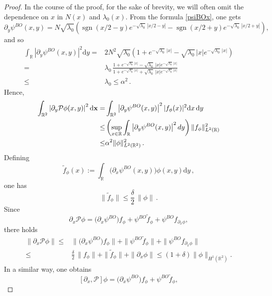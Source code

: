 \documentclass[10pt,a4paper]{amsart}
\newcommand{\NN}{N}
\newcommand{\PP}{\mathcal P}
\newcommand{\RE}{\mathbb R}
\renewcommand{\d}{\mathrm{d}}
\DeclareMathOperator{\sgn}{sgn}
\newcommand{\x}{{\bf  x}}
\begin{document}
\begin{proof}
In the course of the proof, for the sake of brevity, we will often omit the dependence on $x$ in $\NN(x)$ and $\lambda_0(x)$. From the formula \eqref{psiBOx}, one gets
\[
\partial_y \psi^{BO}(x,y) =     {\NN}\sqrt{\lambda_0 } 
\left(\sgn(x/2-y)e^{-\sqrt{\lambda_0 }\,|x/2-y|} - \sgn(x/2+y)e^{-\sqrt{\lambda_0 }\,|x/2+y|}\right) ,
\]
and so
\[\begin{aligned}
\int_\RE \left|\partial_y\psi^{BO}(x,y)\right|^2 \d y  
= & 2 \NN^2 \sqrt{\lambda_0 }\left(1+e^{-\sqrt{\lambda_0 }\,|x|} -\sqrt{\lambda_0 }\,|x| e^{-\sqrt{\lambda_0 }\,|x|} \right) \\ =&  \lambda_0 \,\frac{1+e^{-\sqrt{\lambda_0 }\,|x|} -\sqrt{\lambda_0 }\,|x| e^{-\sqrt{\lambda_0 }\,|x|} }{1+e^{-\sqrt{\lambda_0 }\,|x|} +\sqrt{\lambda_0 }\,|x| e^{-\sqrt{\lambda_0 }\,|x|} } \\
\leq &\lambda_0  \leq\alpha^2\,.
\end{aligned}\]
Hence,
\begin{align*}
\int_{\RE^2}\left|\partial_y\mathcal{P} \phi(x,y)\right|^2 \d\x  = &\int_{\RE^2} \left|\partial_y\psi^{BO}(x,y)\right|^2 |f_\phi(x)|^2 \d x\,\d y  \\
  \leq & \left(\sup_{x \in \RE} \int_\RE \left|\partial_y\psi^{BO}(x,y)
\right|^2 dy \right)\|f_{\phi}\|^2_{L^2(\RE)}\\
\leq &\alpha^{2}\| \phi \|^2_{L^2(\RE^2)}\, .
\end{align*} 
Defining
\begin{equation*}%
    \tilde f_\phi(x) :=  \int_{\RE} \big(\partial_x\psi^{BO}(x,y)\big) \phi(x,y) \d y \,,
    \end{equation*}
one has
     \[
\|  \tilde f_\phi\| \leq \frac{\delta}{2}\,\|\phi\|\,. 
    \]
    Since
    \begin{equation*}%
    \partial_x \PP\phi  = \big(\partial_x\psi^{BO}\big) f_\phi  +\psi^{BO}\tilde f_\phi +  \psi^{BO}f_{\partial_x\phi},
    \end{equation*}
    there holds 
  \[\begin{aligned}
    \|\partial_x \PP \phi\|  \leq & \|\big(\partial_x\psi^{BO}\big) f_\phi\|  +\|\psi^{BO}\tilde f_\phi \| +\|\psi^{BO} f_{\partial_x\phi} \|  \\ 
     \leq &
     \frac\delta2\,\|f_\phi\|  +\|\tilde f_\phi \| + \|\partial_x \phi \| \leq (1+\delta) \|\phi\|_{H^1(\RE^2)} . 
   \end{aligned}
   \]
    In a similar way, one obtains 
 \[
    [\partial_x, \PP]\phi  = \big(\partial_x\psi^{BO}\big) f_\phi  +\psi^{BO}\tilde f_\phi ,
\]
\end{proof}
\end{document}
